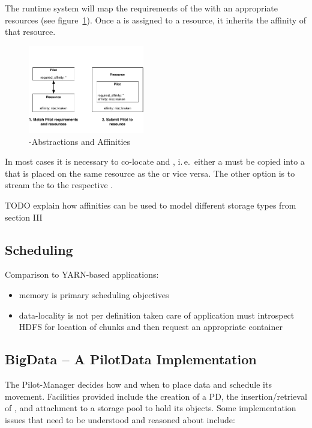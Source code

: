 \documentclass[conference]{IEEEtran}
\begin{document}
The runtime system will map the requirements of the \pilot with an appropriate
resources (see figure~\ref{fig:figures_pilot-affinities}). Once a \pilot is
assigned to a resource, it inherits the affinity of that resource.

\begin{figure}[t]
	\centering
	\includegraphics[width=0.45\textwidth]{figures/pilot-affinities.pdf}
	\caption{\pilot-Abstractions and Affinities}
	\label{fig:figures_pilot-affinities}
\end{figure}


In most cases it is necessary to co-locate \cus and \dus, i.\,e.\ either a \du
must be copied into a \pd that is placed on the same resource as the \pj or
vice versa. The other option is to stream the \du to the respective \cu.

TODO
explain how affinities can be used to model different storage types from section III

\subsection{Scheduling}

Comparison to YARN-based applications:
\begin{itemize}
	\item memory is primary scheduling objectives
	\item data-locality is not per definition taken care of application must 
	introspect HDFS for location of chunks and then request an appropriate 
	container
\end{itemize}


\subsection{BigData -- A PilotData Implementation}


The Pilot-Manager decides how and when to place data and
schedule its movement. Facilities provided include the creation of a
PD, the insertion/retrieval of \dataunits, and attachment to a storage
pool to hold its objects. Some implementation issues that need to be
understood and reasoned about include:
\end{document}
